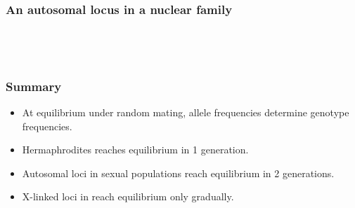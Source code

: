 \documentclass[handout]{beamer}
\begin{document}
\begin{frame}
\frametitle{An autosomal locus in a nuclear family}
\begin{columns}
{\centering\\}

\bigskip

\pause
{}
\end{columns}

\bigskip

\end{frame}

\begin{frame}
\frametitle{Summary}
\begin{itemize}
\item At equilibrium under random mating, allele frequencies determine
  genotype frequencies.
\item Hermaphrodites reaches equilibrium in 1 generation.
\item Autosomal loci in sexual populations reach equilibrium in 2
  generations.
\item X-linked loci in reach equilibrium only gradually.
\end{itemize}
\end{frame}
\end{document}
